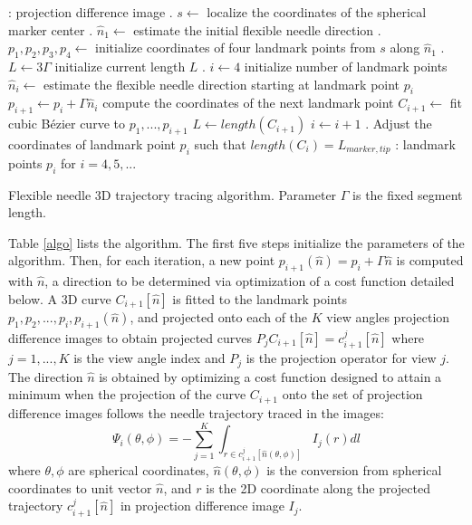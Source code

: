 \begin{table}
\begin{algorithmic}
  : projection difference image 
  . $s\leftarrow$ localize the coordinates of the spherical marker center
  . $\hat{n}_1 \leftarrow$ estimate the initial flexible needle direction
  . $p_1, p_2, p_3, p_4 \leftarrow$ initialize coordinates of four landmark points from $s$ along $\hat{n}_1$
  . $L\leftarrow 3\Gamma$ initialize current length $L$
  . $i\leftarrow 4$ initialize number of landmark points
    \STATE $\hat{n}_{i} \leftarrow$ estimate the flexible needle direction starting at landmark point $p_i$
    \STATE $p_{i+1} \leftarrow p_i + \Gamma \hat{n}_{i}$ compute the coordinates of the next landmark point
    \STATE $C_{i+1}\leftarrow$ fit cubic B\'ezier curve to $p_1, ..., p_{i+1}$
    \STATE $L\leftarrow length(C_{i+1})$ 
    \STATE $i\leftarrow i+1$
  \ENDWHILE
  . Adjust the coordinates of landmark point $p_i$ such that $length(C_i) = L_{marker,tip}$ 
  : landmark points $p_i$ for $i=4,5,...$
  \STATE
  \STATE \hline 
\end{algorithmic}
\caption{Flexible needle 3D trajectory tracing algorithm. Parameter $\Gamma$ is the fixed segment length.}
\label{algo}
\end{table}

Table \ref{algo} lists the algorithm. The first five steps initialize the parameters of the algorithm. Then, for each iteration, a new point $p_{i+1}(\hat{n}) = p_i + \Gamma \hat{n}$ is computed with $\hat{n}$, a direction to be determined via optimization of a cost function detailed below.
A 3D curve $C_{i+1}[\hat{n}]$ is fitted to the landmark points $p_1, p_2, ..., p_i, p_{i+1}(\hat{n})$, and projected onto each of the $K$ view angles projection difference images to obtain projected curves $P_j C_{i+1}[\hat{n}] = c_{i+1}^j[\hat{n}]$ where $j=1,...,K$ is the view angle index and $P_j$ is the projection operator for view $j$.
The direction $\hat{n}$ is obtained by optimizing a cost function designed to attain a minimum when the projection of the curve $C_{i+1}$ onto the set of projection difference images follows the needle trajectory traced in the images:
\begin{equation}
\Psi_i(\theta, \phi) = -\sum_{j=1}^K{\int_{r \in c_{i+1}^j[\hat{n}(\theta, \phi)]} {I_j(r)dl}}
\end{equation}
where $ \theta, \phi$ are spherical coordinates, $ \hat{n}(\theta, \phi) $ is the conversion from spherical coordinates to unit vector $ \hat{n} $, and $r$ is the 2D coordinate along the projected trajectory $c_{i+1}^j[\hat{n}]$ in projection difference image $I_j$. 

